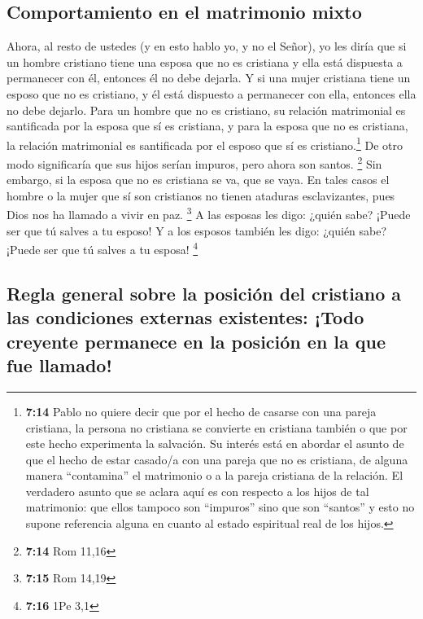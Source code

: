 \hypertarget{comportamiento-en-el-matrimonio-mixto}{%
\subsection{Comportamiento en el matrimonio
mixto}\label{comportamiento-en-el-matrimonio-mixto}}

 Ahora, al resto de ustedes (y en esto hablo yo, y no el
Señor), yo les diría que si un hombre cristiano tiene una esposa que no
es cristiana y ella está dispuesta a permanecer con él, entonces él no
debe dejarla.  Y si una mujer cristiana tiene un esposo
que no es cristiano, y él está dispuesto a permanecer con ella, entonces
ella no debe dejarlo.  Para un hombre que no es
cristiano, su relación matrimonial es santificada por la esposa que sí
es cristiana, y para la esposa que no es cristiana, la relación
matrimonial es santificada por el esposo que sí es cristiano.\footnote{\textbf{7:14}
  Pablo no quiere decir que por el hecho de casarse con una pareja
  cristiana, la persona no cristiana se convierte en cristiana también o
  que por este hecho experimenta la salvación. Su interés está en
  abordar el asunto de que el hecho de estar casado/a con una pareja que
  no es cristiana, de alguna manera ``contamina'' el matrimonio o a la
  pareja cristiana de la relación. El verdadero asunto que se aclara
  aquí es con respecto a los hijos de tal matrimonio: que ellos tampoco
  son ``impuros'' sino que son ``santos'' y esto no supone referencia
  alguna en cuanto al estado espiritual real de los hijos.} De otro modo
significaría que sus hijos serían impuros, pero ahora son santos.
\footnote{\textbf{7:14} Rom 11,16}  Sin embargo, si la
esposa que no es cristiana se va, que se vaya. En tales casos el hombre
o la mujer que sí son cristianos no tienen ataduras esclavizantes, pues
Dios nos ha llamado a vivir en paz. \footnote{\textbf{7:15} Rom 14,19}
 A las esposas les digo: ¿quién sabe? ¡Puede ser que tú
salves a tu esposo! Y a los esposos también les digo: ¿quién sabe?
¡Puede ser que tú salves a tu esposa! \footnote{\textbf{7:16} 1Pe 3,1}

\hypertarget{regla-general-sobre-la-posiciuxf3n-del-cristiano-a-las-condiciones-externas-existentes-todo-creyente-permanece-en-la-posiciuxf3n-en-la-que-fue-llamado}{%
\subsection{Regla general sobre la posición del cristiano a las
condiciones externas existentes: ¡Todo creyente permanece en la posición
en la que fue
llamado!}\label{regla-general-sobre-la-posiciuxf3n-del-cristiano-a-las-condiciones-externas-existentes-todo-creyente-permanece-en-la-posiciuxf3n-en-la-que-fue-llamado}}

